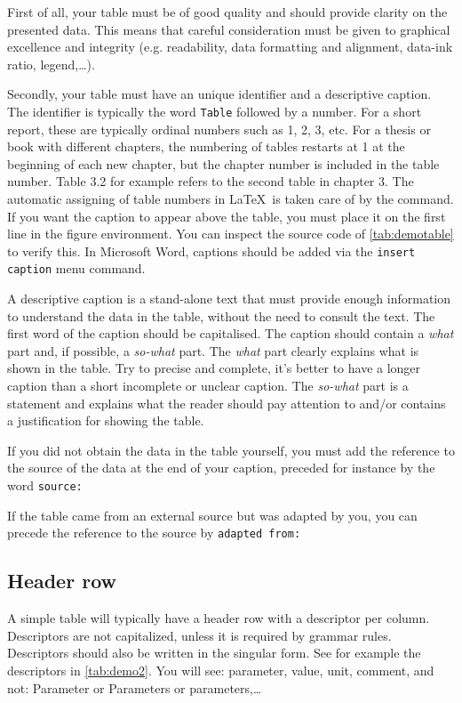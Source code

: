 First of all, your table must be of good quality and should provide clarity on the presented data. This means that careful consideration must be given to graphical excellence and integrity (e.g. readability, data formatting and alignment, data-ink ratio, legend,\dots).

Secondly, your table must have an unique identifier and a descriptive caption. The identifier is typically the word \texttt{Table} followed by a number. For a short report, these are typically ordinal numbers such as 1, 2, 3, etc. For a thesis or book with different chapters, the numbering of tables restarts at 1 at the beginning of each new chapter, but the chapter number is included in the table number. Table 3.2 for example refers to the second table in chapter 3. The automatic assigning of table numbers in \LaTeX\ is taken care of by the  command. If you want the caption to appear above the table, you must place it on the first line in the figure environment. You can inspect the source code of \cref{tab:demotable} to verify this. In Microsoft Word, captions should be added via the \texttt{insert caption} menu command.

A descriptive caption is a stand-alone text that must provide enough information to understand the data in the table, without the need to consult the text. The first word of the caption should be capitalised. The caption should contain a \textit{what} part and, if possible, a \textit{so-what} part. The \textit{what} part clearly explains what is shown in the table. Try to precise and complete, it's better to have a longer caption than a short incomplete or unclear caption. The \textit{so-what} part is a statement and explains what the reader should pay attention to and/or contains a justification for showing the table.

If you did not obtain the data in the table yourself, you must add the reference to the source of the data at the end of your caption, preceded for instance by the word \verb|source:|

If the table came from an external source but was adapted by you, you can precede the reference to the source by \verb|adapted from:|

\subsection{Header row}
A simple table will typically have a header row with a descriptor per column. Descriptors are not capitalized, unless it is required by grammar rules. Descriptors should also be written in the singular form. See for example the descriptors in \cref{tab:demo2}. You will see: parameter, value, unit, comment, and not: Parameter or Parameters or parameters,\dots

